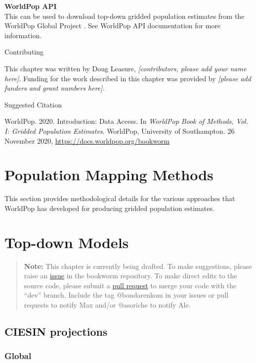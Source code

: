 \documentclass[]{book}
\begin{document}
\textbf{WorldPop API}\\
This can be used to download top-down gridded population estimates from
the WorldPop Global Project \citeyearpar[WorldPop et
al][]{worldpop2018global}. See WorldPop API documentation for more
information.

Contributing

This chapter was written by Doug Leasure, \emph{{[}contributors, please
add your name here{]}}. Funding for the work described in this chapter
was provided by \emph{{[}please add funders and grant numbers here{]}}.

Suggested Citation

WorldPop. 2020. Introduction: Data Access. In \emph{WorldPop Book of
Methods, Vol. I: Gridded Population Estimates}. WorldPop, University of
Southampton. 26 November 2020, \url{https://docs.worldpop.org/bookworm}

\chapter*{Population Mapping Methods}\label{population-mapping-methods}

This section provides methodological details for the various approaches
that WorldPop has developed for producing gridded population estimates.

\hypertarget{top-down-models}{\chapter{Top-down
Models}\label{top-down-models}}

\begin{quote}
\textbf{Note:} This chapter is currently being drafted. To make
suggestions, please raise an
\href{https://github.com/wpgp/bookworm/issues}{issue} in the bookworm
repository. To make direct edits to the source code, please submit a
\href{https://github.com/wpgp/bookworm/pulls}{pull request} to merge
your code with the ``dev'' branch. Include the tag @bondarenkom in your
issues or pull requests to notify Max and/or @asoriche to notify Ale.
\end{quote}

\section{CIESIN projections}\label{ciesin-projections}

\subsection{Global}\label{global}
\end{document}

